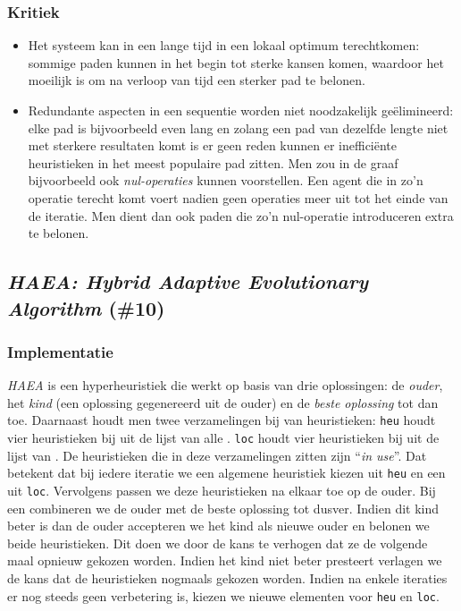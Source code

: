 \subsubsection{Kritiek}
\begin{itemize}
 \item Het systeem kan in een lange tijd in een lokaal optimum terechtkomen: sommige paden kunnen in het begin tot sterke kansen komen, waardoor het moeilijk is om na verloop van tijd een sterker pad te belonen.
 \item Redundante aspecten in een sequentie worden niet noodzakelijk ge\"elimineerd: elke pad is bijvoorbeeld even lang en zolang een pad van dezelfde lengte niet met sterkere resultaten komt is er geen reden kunnen er ineffici\"ente heuristieken in het meest populaire pad zitten. Men zou in de graaf bijvoorbeeld ook \emph{nul-operaties} kunnen voorstellen. Een agent die in zo'n operatie terecht komt voert nadien geen operaties meer uit tot het einde van de iteratie. Men dient dan ook paden die zo'n nul-operatie introduceren extra te belonen.
\end{itemize}
\subsection{\emph{HAEA: Hybrid Adaptive Evolutionary Algorithm} (\#10)}
\label{sss:haea}
\subsubsection{Implementatie}
\emph{HAEA}\cite{chesc-haea,Gomez04selfadaptation} is een hyperheuristiek die werkt op basis van drie oplossingen: de \emph{ouder}, het \emph{kind} (een oplossing gegenereerd uit de ouder) en de \emph{beste oplossing} tot dan toe. Daarnaast houdt men twee verzamelingen bij van heuristieken: \texttt{heu} houdt vier heuristieken bij uit de lijst van alle \abllhn{}. \texttt{loc} houdt vier heuristieken bij uit de lijst van \abls{} \abllhn{}. De heuristieken die in deze verzamelingen zitten zijn ``\emph{in use}''. Dat betekent dat bij iedere iteratie we een algemene heuristiek kiezen uit \texttt{heu} en een \abls{} \abllh{} uit \texttt{loc}. Vervolgens passen we deze heuristieken na elkaar toe op  de ouder. Bij een \abco{} \abllh{} combineren we de ouder met de beste oplossing tot dusver. Indien dit kind beter is dan de ouder accepteren we het kind als nieuwe ouder en belonen we beide heuristieken. Dit doen we door de kans te verhogen dat ze de volgende maal opnieuw gekozen worden. Indien het kind niet beter presteert verlagen we de kans dat de heuristieken nogmaals gekozen worden. Indien na enkele iteraties er nog steeds geen verbetering is, kiezen we nieuwe elementen voor \texttt{heu} en \texttt{loc}.
